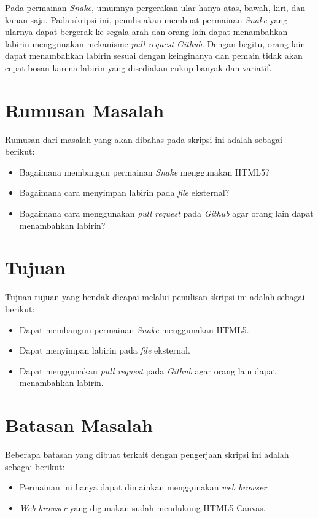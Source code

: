 Pada permainan \textit{Snake}, umumnya pergerakan ular hanya atas, bawah, kiri, dan kanan saja. Pada skripsi ini, penulis akan membuat permainan \textit{Snake} yang ularnya dapat bergerak ke segala arah dan orang lain dapat menambahkan labirin menggunakan mekanisme \textit{pull request Github}. Dengan begitu, orang lain dapat menambahkan labirin sesuai dengan keinginanya dan pemain tidak akan cepat bosan karena labirin yang disediakan cukup banyak dan variatif.

\section{Rumusan Masalah}
\label{sec:rumusan}
Rumusan dari masalah yang akan dibahas pada skripsi ini adalah sebagai berikut:
\begin{itemize}
	\item Bagaimana membangun permainan \textit{Snake} menggunakan HTML5?
	\item Bagaimana cara menyimpan labirin pada \textit{file} eksternal?
	\item Bagaimana cara menggunakan \textit{pull request} pada \textit{Github} agar orang lain dapat menambahkan labirin?
\end{itemize}


\section{Tujuan}
\label{sec:tujuan}
Tujuan-tujuan yang hendak dicapai melalui penulisan skripsi ini adalah sebagai berikut:
\begin{itemize}
	\item Dapat membangun permainan \textit{Snake} menggunakan HTML5.
	\item Dapat menyimpan labirin pada \textit{file} eksternal.
	\item Dapat menggunakan \textit{pull request} pada \textit{Github} agar orang lain dapat menambahkan labirin.
\end{itemize}


\section{Batasan Masalah}
\label{sec:batasan}
Beberapa batasan yang dibuat terkait dengan pengerjaan skripsi ini adalah sebagai berikut:
\begin{itemize}
	\item Permainan ini hanya dapat dimainkan menggunakan \textit{web browser}.
	\item \textit{Web browser} yang digunakan sudah mendukung HTML5 Canvas.
\end{itemize}


